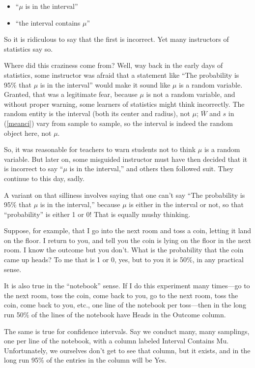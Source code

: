 \begin{itemize}

\item ``$\mu$ is in the interval''

\item ``the interval contains $\mu$''

\end{itemize}

So it is ridiculous to say that the first is incorrect.  Yet many
instructors of statistics say so.

Where did this craziness come from?  Well, way back in the early days of
statistics, some instructor was afraid that a statement like ``The
probability is 95\% that $\mu$ is in the interval'' would make it sound
like $\mu$ is a random variable.  Granted, that was a legitimate fear,
because $\mu$ is not a random variable, and without proper warning, some
learners of statistics might think incorrectly.  The random entity is
the interval (both its center and radius), not $\mu$;  $\overline{W}$
and $s$ in (\ref{meanci}) vary from sample to sample, so the interval is
indeed the random object here, not $\mu$.  

So, it was reasonable for teachers to warn students not to think $\mu$
is a random variable.  But later on, some misguided instructor must have
then decided that it is incorrect to say ``$\mu$ is in the interval,''
and others then followed suit.  They continue to this day, sadly.

A variant on that silliness involves saying that one can't say ``The
probability is 95\% that $\mu$ is in the interval,'' because $\mu$ is
either in the interval or not, so that ``probability'' is either 1 or 0!
That is equally mushy thinking.

Suppose, for example, that I go into the next room and toss a coin,
letting it land on the floor.  I return to you, and tell you the coin is
lying on the floor in the next room.  I know the outcome but you don't.
What is the probability that the coin came up heads?  To me that is 1 or
0, yes, but to you it is 50\%, in any practical sense.  

It is also true in the ``notebook'' sense.  If I do this experiment many
times---go to the next room, toss the coin, come back to you,
go to the next room, toss the coin, come back to you, etc., one line of
the notebook per toss---then in the long run 50\% of the lines of the
notebook have Heads in the Outcome column.  

The same is true for confidence intervals.  Say we conduct many, many
samplings, one per line of the notebook, with a column labeled Interval
Contains Mu. Unfortunately, we ourselves don't get to see that column,
but it exists, and in the long run 95\% of the entries in the column
will be Yes.  

